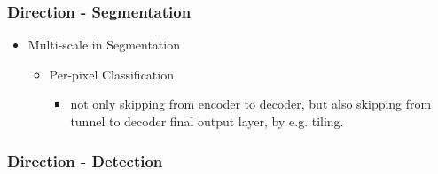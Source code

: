 \subsubsection{Direction - Segmentation}
\begin{itemize}
\item  Multi-scale in Segmentation
	\begin{itemize}
	\item Per-pixel Classification
		\begin{itemize}
		\item not only skipping from encoder to decoder, but also skipping from tunnel to decoder final output layer, by e.g. tiling.
		\end{itemize}
	\end{itemize}
\end{itemize}
\subsubsection{Direction - Detection}
